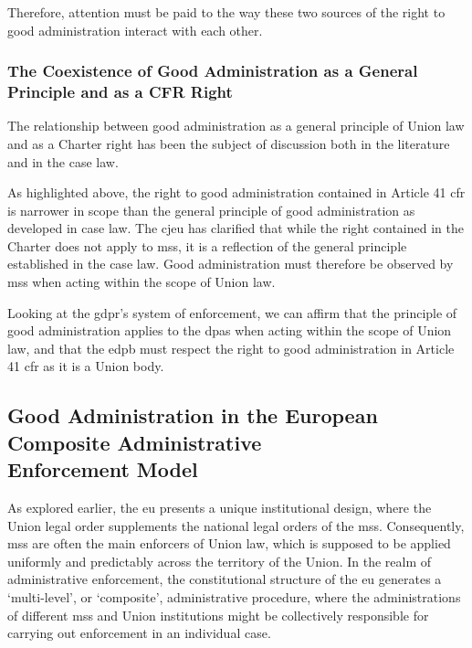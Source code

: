 Therefore, attention must be paid to the way these two sources of the right to good administration interact with each other.

\subsubsection[\texorpdfstring{The Coexistence of Good Administration as a General Principle\\and as a CFR Right}{The Coexistence of Good Administration as a General Principle and as a CFR Right}]{The Coexistence of Good Administration as a General Principle and as a CFR Right}
\label{sec:ch2-coexistence-principle-cfr}

The relationship between good administration as a general principle of Union law and as a Charter right has been the subject of discussion both in the literature and in the case law.\autocite{mihaescu-evansRightGoodAdministration2015}

As highlighted above, the right to good administration contained in Article 41 \gls{cfr} is narrower in scope than the general principle of good administration as developed in case law.\autocite[148]{mihaescu-evansRightGoodAdministration2015}
The \gls{cjeu} has clarified that while the right contained in the Charter does not apply to \glspl{ms},\autocite[68--69]{ysVMinister} it is a reflection of the general principle established in the case law.\autocite[49]{HNvMinisterJustice}
Good administration must therefore be observed by \glspl{ms} when acting within the scope of Union law.\autocite[50]{HNvMinisterJustice}

Looking at the \gls{gdpr}'s system of enforcement, we can affirm that the principle of good administration applies to the \glspl{dpa} when acting within the scope of Union law, and that the \gls{edpb} must respect the right to good administration in Article 41 \gls{cfr} as it is a Union body.\autocite[11(1)]{EDPBRulesofProcedure}

\subsection[Good Administration in the European Composite Administrative Enforcement Model]{Good Administration in the European Composite Administrative\\Enforcement Model}
\label{sec:ch2-composite-enforcement-model}

As explored earlier, the \gls{eu} presents a unique institutional design, where the Union legal order supplements the national legal orders of the \glspl{ms}. 
Consequently, \glspl{ms} are often the main enforcers of Union law, which is supposed to be applied uniformly and predictably across the territory of the Union.
In the realm of administrative enforcement, the constitutional structure of the \gls{eu} generates a `multi-level', or `composite', administrative procedure, where the administrations of different \glspl{ms} and Union institutions might be collectively responsible for carrying out enforcement in an individual case.\autocites[137--138]{hofmannCompositeDecisionMaking2009}[91--92]{mihaescu-evansRightGoodAdministration2015}

